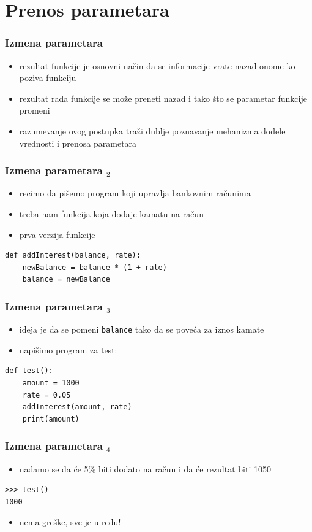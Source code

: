 \documentclass[compress]{beamer}
\begin{document}
\section{Prenos parametara}

\begin{frame}[fragile]
  \frametitle{Izmena parametara}
  \begin{itemize}
    \item rezultat funkcije je osnovni način da se informacije vrate nazad onome ko poziva funkciju
    \item rezultat rada funkcije se može preneti nazad i tako što se parametar funkcije promeni
    \item razumevanje ovog postupka traži dublje poznavanje mehanizma dodele vrednosti i prenosa parametara
  \end{itemize}
\end{frame}

\begin{frame}[fragile]
  \frametitle{Izmena parametara $_2$}
  \begin{itemize}
    \item recimo da pišemo program koji upravlja bankovnim računima
    \item treba nam funkcija koja dodaje kamatu na račun
    \item prva verzija funkcije
  \end{itemize}
\begin{verbatim}
def addInterest(balance, rate):
    newBalance = balance * (1 + rate)
    balance = newBalance
\end{verbatim}
\end{frame}

\begin{frame}[fragile]
  \frametitle{Izmena parametara $_3$}
  \begin{itemize}
    \item ideja je da se pomeni \texttt{balance} tako da se poveća za iznos kamate
    \item napišimo program za test:
  \end{itemize}
\begin{verbatim}
def test():
    amount = 1000
    rate = 0.05
    addInterest(amount, rate)
    print(amount)
\end{verbatim}
\end{frame}

\begin{frame}[fragile]
  \frametitle{Izmena parametara $_4$}
  \begin{itemize}
    \item nadamo se da će 5\% biti dodato na račun i da će rezultat biti 1050
  \end{itemize}
\begin{verbatim}
>>> test()
1000
\end{verbatim}
  \begin{itemize}
    \item nema greške, sve je u redu!
  \end{itemize}
\end{frame}
\end{document}
